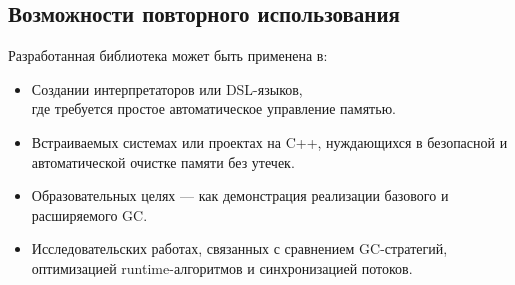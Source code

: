 \subsection{Возможности повторного использования}

Разработанная библиотека может быть применена в:

\begin{itemize}
    \item Создании интерпретаторов или DSL-языков,\\ где требуется простое автоматическое управление памятью.
    \item Встраиваемых системах или проектах на C++, нуждающихся в безопасной и автоматической очистке памяти без утечек.
    \item Образовательных целях — как демонстрация реализации базового и расширяемого GC.
    \item Исследовательских работах, связанных с сравнением GC-стратегий, \\оптимизацией runtime-алгоритмов и синхронизацией потоков.
\end{itemize}
